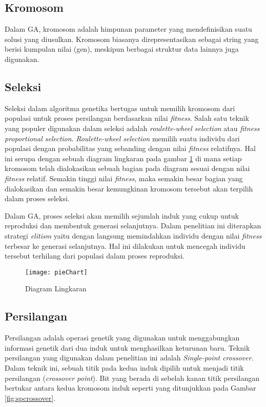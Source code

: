 \subsection{Kromosom}
\label{sub:chromosome}
Dalam GA, kromosom adalah himpunan parameter yang mendefinisikan suatu solusi yang diusulkan. Kromosom biasanya direpresentasikan sebagai string yang berisi kumpulan nilai (gen), meskipun berbagai struktur data lainnya juga digunakan.

\subsection{Seleksi}
\label{sub:selection}
Seleksi dalam algoritma genetika bertugas untuk memilih kromosom dari populasi untuk proses persilangan berdasarkan nilai \textit{fitness}. Salah satu teknik yang populer digunakan dalam seleksi adalah \textit{roulette-wheel selection} atau \textit{fitness proportional selection}. \textit{Roulette-wheel selection} memilih suatu individu dari populasi dengan probabilitas yang sebanding dengan nilai \textit{fitness} relatifnya. Hal ini serupa dengan sebuah diagram lingkaran pada gambar \ref{fig:pieChart} di mana setiap kromosom telah dialokasikan sebuah bagian pada diagram sesuai dengan nilai \textit{fitness} relatif. Semakin tinggi nilai \textit{fitness}, maka semakin besar bagian yang dialokasikan dan semakin besar kemungkinan kromosom tersebut akan terpilih dalam proses seleksi.

Dalam GA, proses seleksi akan memilih sejumlah induk yang cukup untuk reproduksi dan membentuk generasi selanjutnya. Dalam penelitian ini diterapkan strategi \textit{elitism} yaitu dengan langsung memindahkan individu dengan nilai \textit{fitness} terbesar ke generasi selanjutnya. Hal ini dilakukan untuk mencegah individu tersebut terhilang dari populasi dalam proses reproduksi.

\begin{figure}[h]
	\begin{center}
		\texttt{[image: pieChart]}
		\caption{Diagram Lingkaran}
		\label{fig:pieChart}
	\end{center}
\end{figure}

\subsection{Persilangan}
\label{sub:crossover}
Persilangan adalah operasi genetik yang digunakan untuk menggabungkan informasi genetik dari dua induk untuk menghasilkan keturunan baru. Teknik persilangan yang digunakan dalam penelitian ini adalah \textit{Single-point crossover}. Dalam teknik ini, sebuah titik pada kedua induk dipilih untuk menjadi titik persilangan (\textit{crossover point}). Bit yang berada di sebelah kanan titik persilangan bertukar antara kedua kromosom induk seperti yang ditunjukkan pada Gambar \ref{fig:spcrossover}.

